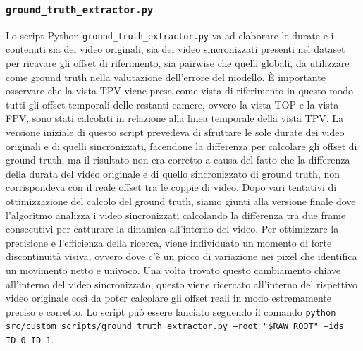 \subsubsection{\texttt{ground\_truth\_extractor.py}}
Lo script Python \texttt{ground\_truth\_extractor.py} va ad elaborare le durate e i contenuti sia dei video originali, sia dei video sincronizzati presenti nel dataset per ricavare gli offset di riferimento, sia pairwise che quelli globali, da utilizzare come ground truth nella valutazione dell'errore del modello. È importante osservare che la vista TPV viene presa come vista di riferimento in questo modo tutti gli offset temporali delle restanti camere, ovvero la vista TOP e la vista FPV, sono stati calcolati in relazione alla linea temporale della vista TPV. La versione iniziale di questo script prevedeva di sfruttare le sole durate dei video originali e di quelli sincronizzati, facendone la differenza per calcolare gli offset di ground truth, ma il risultato non era corretto a causa del fatto che la differenza della durata del video originale e di quello sincronizzato di ground truth, non corrispondeva con il reale offset tra le coppie di video. Dopo vari tentativi di ottimizzazione del calcolo del ground truth, siamo giunti alla versione finale dove l'algoritmo analizza i video sincronizzati calcolando la differenza tra due frame consecutivi per catturare la dinamica all'interno del video. Per ottimizzare la precisione e l'efficienza della ricerca, viene individuato un momento di forte discontinuità visiva, ovvero dove c'è un picco di variazione nei pixel che identifica un movimento netto e univoco. Una volta trovato questo cambiamento chiave all'interno del video sincronizzato, questo viene ricercato all'interno del rispettivo video originale così da poter calcolare gli offset reali in modo estremamente preciso e corretto. Lo script può essere lanciato seguendo il comando \texttt{python src/custom\_scripts/ground\_truth\_extractor.py --root "\$RAW\_ROOT" --ids ID\_0 ID\_1}.

